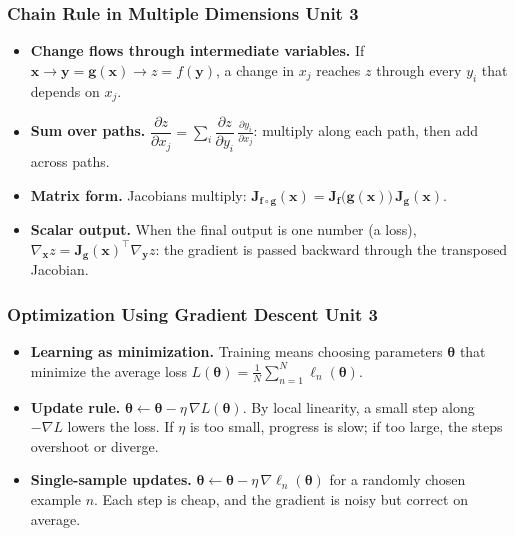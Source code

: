 \documentclass[12pt]{beamer}
\newcommand{\FrameTitle}[2]{\frametitle{#1 \hfill \small\textnormal{\textcolor{midgray}{#2}}}}
\begin{document}
\begin{frame}\FrameTitle{Chain Rule in Multiple Dimensions}{Unit 3}
    \begin{itemize}
        \item \textbf{Change flows through intermediate variables.} If
              $\symbf{x} \to \symbf{y} = \symbf{g}(\symbf{x}) \to z = f(\symbf{y})$,
              a change in $x_j$ reaches $z$ through every $y_i$ that depends
              on $x_j$.
        \item \textbf{Sum over paths.}
              $\displaystyle \dfrac{\partial z}{\partial x_j}
              = \sum_i \dfrac{\partial z}{\partial y_i}\,
                       \frac{\partial y_i}{\partial x_j}$:
              multiply along each path, then add across paths.
        \item \textbf{Matrix form.} Jacobians multiply:
              $\symbf{J}_{\symbf{f}\circ\symbf{g}}(\symbf{x})
              = \symbf{J}_{\symbf{f}}\bigl(\symbf{g}(\symbf{x})\bigr)\,
                \symbf{J}_{\symbf{g}}(\symbf{x})$.
        \item \textbf{Scalar output.} When the final output is one number
              (a loss),
              $\nabla_{\symbf{x}} z = \symbf{J}_{\symbf{g}}(\symbf{x})^\top
              \nabla_{\symbf{y}} z$: the gradient is passed backward through
              the transposed Jacobian.
    \end{itemize}
\end{frame}

\begin{frame}\FrameTitle{Optimization Using Gradient Descent}{Unit 3}
    \begin{itemize}
        \item \textbf{Learning as minimization.} Training means choosing
              parameters $\symbf{\theta}$ that minimize the average loss
              $L(\symbf{\theta}) = \frac{1}{N}\sum_{n=1}^{N} \ell_n(\symbf{\theta})$.
        \item \textbf{Update rule.}
              $\symbf{\theta} \leftarrow \symbf{\theta} - \eta\,\nabla L(\symbf{\theta})$.
              By local linearity, a small step along $-\nabla L$ lowers the
              loss. If $\eta$ is too small, progress is slow; if too large,
              the steps overshoot or diverge.
        \item \textbf{Single-sample updates.}
              $\symbf{\theta} \leftarrow \symbf{\theta} - \eta\,\nabla \ell_n(\symbf{\theta})$
              for a randomly chosen example $n$. Each step is cheap, and the
              gradient is noisy but correct on average.
    \end{itemize}
\end{frame}
\end{document}

